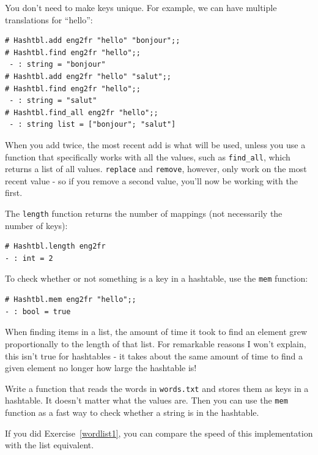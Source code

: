 \documentclass[10pt]{book}
\begin{document}
{You don't need to make keys unique. For example, we can have
multiple translations for ``hello'':

\beforeverb
\begin{verbatim}
# Hashtbl.add eng2fr "hello" "bonjour";;
# Hashtbl.find eng2fr "hello";;
 - : string = "bonjour"
# Hashtbl.add eng2fr "hello" "salut";;
# Hashtbl.find eng2fr "hello";;
 - : string = "salut"
# Hashtbl.find_all eng2fr "hello";;
 - : string list = ["bonjour"; "salut"]
\end{verbatim}
\afterverb
When you add twice, the most recent add is what will be used, unless
you use a function that specifically works with all the values, such 
as {\tt \verb"find_all"}, which returns a list of all values. {\tt replace} 
and {\tt remove}, however, only work on the most recent value - so
if you remove a second value, you'll now be working with the first.

The {\tt length} function returns the number of mappings (not necessarily
the number of keys):

\beforeverb
\begin{verbatim}
# Hashtbl.length eng2fr
- : int = 2
\end{verbatim}
\afterverb

To check whether or not something is a key in a hashtable, use the {\tt mem}
function:

\beforeverb
\begin{verbatim}
# Hashtbl.mem eng2fr "hello";;
- : bool = true
\end{verbatim}
\afterverb


When finding items in a list, the amount of time it took to find an element
grew proportionally to the length of that list. For remarkable reasons I won't
explain, this isn't true for hashtables - it takes about the same amount of time
to find a given element no longer how large the hashtable is!


\begin{ex}
\label{wordlist2}


Write a function that reads the words in {\tt words.txt} and
stores them as keys in a hashtable.  It doesn't matter what the
values are.  Then you can use the {\tt mem} function
as a fast way to check whether a string is in
the hashtable.

If you did Exercise~\ref{wordlist1}, you can compare the speed
of this implementation with the list equivalent.


\end{ex}}
\end{document}
